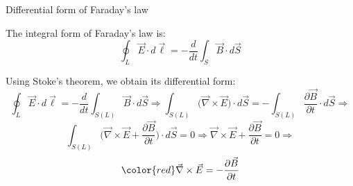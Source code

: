\begin{frame}{Differential form of Faraday's law}

The integral form of Faraday's law is:
\begin{equation*}
   \oint_{L} \vec{E} \cdot d\vec{\ell} = - \frac{d}{dt} \int_{S} \vec{B} \cdot d\vec{S}
\end{equation*}

Using Stoke's theorem, we obtain its differential form:
\begin{equation*}
   \oint_{L} \vec{E} \cdot d\vec{\ell} = - \frac{d}{dt} \int_{S(L)} \vec{B} \cdot d\vec{S} \Rightarrow
   \int_{S(L)} \Big( \vec{\nabla} \times \vec{E} \Big) \cdot d\vec{S} =
     - \int_{S(L)} \frac{\partial \vec{B}}{\partial t} \cdot d\vec{S} \Rightarrow
\end{equation*}
\begin{equation*}
   \int_{S(L)} \Big( \vec{\nabla} \times \vec{E} + \frac{\partial \vec{B}}{\partial t} \Big) \cdot d\vec{S} = 0  \Rightarrow
   \vec{\nabla} \times \vec{E} + \frac{\partial \vec{B}}{\partial t} = 0 \Rightarrow
\end{equation*}
\begin{equation*}
{\color{red}
   \vec{\nabla} \times \vec{E} = - \frac{\partial \vec{B}}{\partial t}
}
\end{equation*}

\end{frame}



%
%

